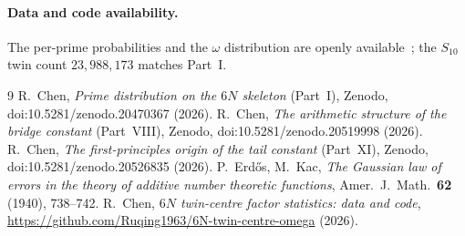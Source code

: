 \documentclass[11pt]{article}
\begin{document}
\paragraph{Data and code availability.}
The per-prime probabilities and the $\omega$ distribution are openly
available~\cite{repo}; the $S_{10}$ twin count $23{,}988{,}173$ matches Part~I.

\begin{thebibliography}{9}
 R.~Chen, \emph{Prime distribution on the $6N$ skeleton} (Part~I),
Zenodo, doi:10.5281/zenodo.20470367 (2026).
 R.~Chen, \emph{The arithmetic structure of the bridge
constant} (Part~VIII), Zenodo, doi:10.5281/zenodo.20519998 (2026).
 R.~Chen, \emph{The first-principles origin of the tail constant}
(Part~XI), Zenodo, doi:10.5281/zenodo.20526835 (2026).
 P.~Erd\H{o}s, M.~Kac, \emph{The Gaussian law of errors in the theory
of additive number theoretic functions}, Amer.\ J.\ Math.\ \textbf{62} (1940),
738--742.
 R.~Chen, \emph{$6N$ twin-centre factor statistics: data and code},
\url{https://github.com/Ruqing1963/6N-twin-centre-omega}  (2026).
\end{thebibliography}
\end{document}
